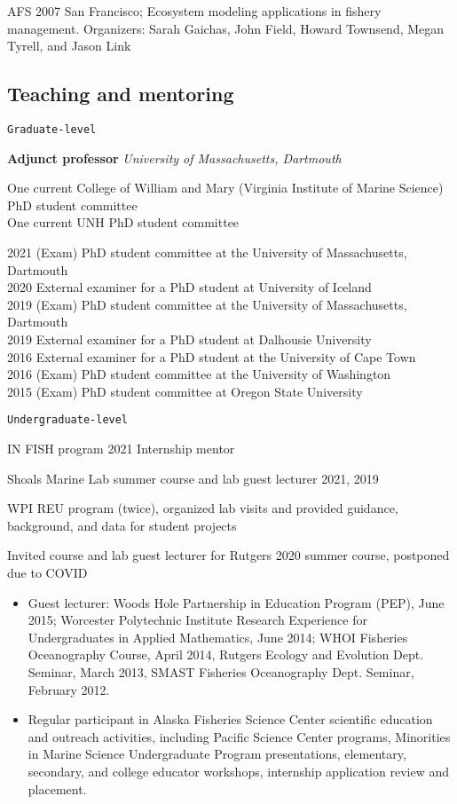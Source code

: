 \documentclass[11pt, a4paper]{awesome-cv}
\begin{document}
AFS 2007 San Francisco; Ecosystem modeling applications in fishery
management. Organizers: Sarah Gaichas, John Field, Howard Townsend,
Megan Tyrell, and Jason Link

\hypertarget{teaching-and-mentoring}{%
\subsection{Teaching and mentoring}\label{teaching-and-mentoring}}

\begin{verbatim}
Graduate-level
\end{verbatim}

\textbf{Adjunct professor} \emph{University of Massachusetts, Dartmouth}

One current College of William and Mary (Virginia Institute of Marine
Science) PhD student committee\\
One current UNH PhD student committee

2021 (Exam) PhD student committee at the University of Massachusetts,
Dartmouth\\
2020 External examiner for a PhD student at University of Iceland\\
2019 (Exam) PhD student committee at the University of Massachusetts,
Dartmouth\\
2019 External examiner for a PhD student at Dalhousie University\\
2016 External examiner for a PhD student at the University of Cape
Town\\
2016 (Exam) PhD student committee at the University of Washington\\
2015 (Exam) PhD student committee at Oregon State University

\begin{verbatim}
Undergraduate-level
\end{verbatim}

IN FISH program 2021 Internship mentor

Shoals Marine Lab summer course and lab guest lecturer 2021, 2019

WPI REU program (twice), organized lab visits and provided guidance,
background, and data for student projects

Invited course and lab guest lecturer for Rutgers 2020 summer course,
postponed due to COVID

\begin{itemize}
\item
  Guest lecturer: Woods Hole Partnership in Education Program (PEP),
  June 2015; Worcester Polytechnic Institute Research Experience for
  Undergraduates in Applied Mathematics, June 2014; WHOI Fisheries
  Oceanography Course, April 2014, Rutgers Ecology and Evolution Dept.
  Seminar, March 2013, SMAST Fisheries Oceanography Dept. Seminar,
  February 2012.
\item
  Regular participant in Alaska Fisheries Science Center scientific
  education and outreach activities, including Pacific Science Center
  programs, Minorities in Marine Science Undergraduate Program
  presentations, elementary, secondary, and college educator workshops,
  internship application review and placement.
\end{itemize}
\end{document}
